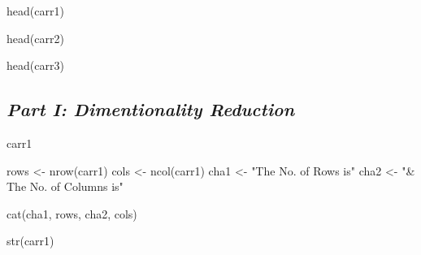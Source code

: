 \documentclass[
]{article}
\newenvironment{Shaded}{\begin{snugshade}}{\end{snugshade}}
\newcommand{\FunctionTok}[1]{\textcolor[rgb]{0.00,0.00,0.00}{#1}}
\newcommand{\NormalTok}[1]{#1}
\newcommand{\OtherTok}[1]{\textcolor[rgb]{0.56,0.35,0.01}{#1}}
\newcommand{\StringTok}[1]{\textcolor[rgb]{0.31,0.60,0.02}{#1}}
\begin{document}
\begin{Shaded}
\begin{Highlighting}[]
\FunctionTok{head}\NormalTok{(carr1)}
\end{Highlighting}
\end{Shaded}

\begin{Shaded}
\begin{Highlighting}[]
\FunctionTok{head}\NormalTok{(carr2)}
\end{Highlighting}
\end{Shaded}

\begin{Shaded}
\begin{Highlighting}[]
\FunctionTok{head}\NormalTok{(carr3)}
\end{Highlighting}
\end{Shaded}

\hypertarget{part-i-dimentionality-reduction}{%
\subsection{\texorpdfstring{\textbf{\emph{Part I: Dimentionality
Reduction}}}{Part I: Dimentionality Reduction}}\label{part-i-dimentionality-reduction}}

\begin{Shaded}
\begin{Highlighting}[]
\NormalTok{carr1}
\end{Highlighting}
\end{Shaded}

\begin{Shaded}
\begin{Highlighting}[]
\NormalTok{rows }\OtherTok{\textless{}{-}} \FunctionTok{nrow}\NormalTok{(carr1)}
\NormalTok{cols }\OtherTok{\textless{}{-}} \FunctionTok{ncol}\NormalTok{(carr1)}
\NormalTok{cha1 }\OtherTok{\textless{}{-}} \StringTok{"The No. of Rows is"}
\NormalTok{cha2 }\OtherTok{\textless{}{-}}  \StringTok{"\& The No. of Columns is"} 

\FunctionTok{cat}\NormalTok{(cha1, rows, cha2, cols)}
\end{Highlighting}
\end{Shaded}

\begin{Shaded}
\begin{Highlighting}[]
\FunctionTok{str}\NormalTok{(carr1)}
\end{Highlighting}
\end{Shaded}
\end{document}
